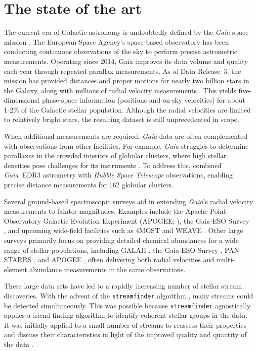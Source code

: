 \section{The state of the art}
    The current era of Galactic astronomy is undoubtedly defined by the \emph{Gaia} space mission \citep{2016A&A...595A...1G,2016A&A...595A...2G,2018A&A...616A...1G,2021A&A...650C...3G,2023A&A...674A...1G}. The European Space Agency's space-based observatory has been conducting continuous observations of the sky to perform precise astrometric measurements. Operating since 2014, Gaia improves its data volume and quality each year through repeated parallax measurements.  As of Data Release~3, the mission has provided distances and proper motions for nearly two billion stars in the Galaxy, along with millions of radial velocity measurements \citep{2023A&A...674A...1G}. This yields five-dimensional phase-space information (positions and on-sky velocities) for about 1-2\% of the Galactic stellar population. Although the radial velocities are limited to relatively bright stars, the resulting dataset is still unprecedented in scope.

    When additional measurements are required, \emph{Gaia} data are often complemented with observations from other facilities.  For example, \emph{Gaia} struggles to determine parallaxes in the crowded interiors of globular clusters, where high stellar densities pose challenges for its instruments \citep{2017MNRAS.467..412P}. To address this, \citet{2021MNRAS.505.5957B} combined \emph{Gaia}~EDR3 astrometry with \emph{Hubble Space Telescope} observations, enabling precise distance measurements for 162 globular clusters.

    Several ground-based spectroscopic surveys aid in extending \emph{Gaia}'s radial velocity measurements to fainter magnitudes. Examples include the Apache Point Observatory Galactic Evolution Experiment (APOGEE; \citep{2017AJ....154...94M}), the Gaia-ESO Survey \citep{2023A&A...676A.129H}, and upcoming wide-field facilities such as 4MOST \citep{2019Msngr.175....3D} and WEAVE \citep{2014SPIE.9147E..0LD}.  Other large surveys primarily focus on providing detailed chemical abundances for a wide range of stellar populations, including GALAH \citep{2012ASPC..458..421Z}, the Gaia-ESO Survey \citep{2023A&A...676A.129H}, PAN-STARRS \citep{2016arXiv161205560C}, and APOGEE \citep{2017AJ....154...94M}, often delivering both radial velocities and multi-element abundance measurements in the same observations.

    These large data sets have led to a rapidly increasing number of stellar stream discoveries. With the advent of the \texttt{streamfinder} algorithm \citep{2018MNRAS.477.4063M,2018MNRAS.478.3862M}, many streams could be detected simultaneously. This was possible because \texttt{streamfinder} agnostically applies a friend-finding algorithm to identify coherent stellar groups in the data. It was initially applied to a small number of streams to reassess their properties and discuss their characteristics in light of the improved quality and quantity of the data \citep{2019NatAs...3..667I,2020ApJ...891..161I}.

